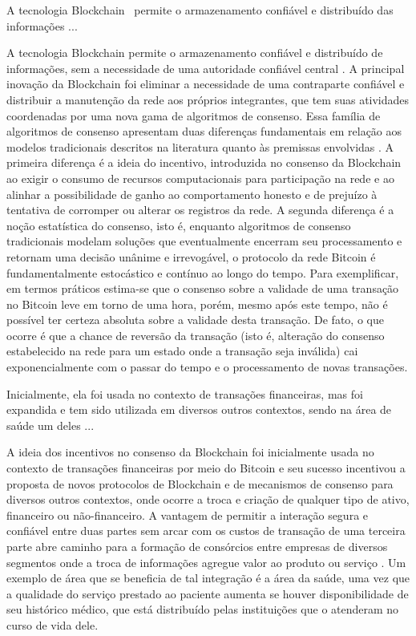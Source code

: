 \documentclass[a4paper,11pt]{article}
\begin{document}
{\color{blue} A tecnologia Blockchain~\cite{nakamoto2008bitcoin} permite o armazenamento confiável e distribuído das informações ...}

A tecnologia Blockchain permite o armazenamento confiável e distribuído de informações, sem a necessidade de uma autoridade confiável central \cite{Swan2015}.
A principal inovação da Blockchain foi eliminar a necessidade de uma contraparte confiável e distribuir a manutenção da rede aos próprios integrantes, que tem suas atividades coordenadas por uma nova gama de algoritmos de consenso.
Essa família de algoritmos de consenso apresentam duas diferenças fundamentais em relação aos modelos tradicionais descritos na literatura quanto às premissas envolvidas \cite{Narayanan2016a}.
A primeira diferença é a ideia do incentivo, introduzida no consenso da Blockchain ao exigir o consumo de recursos computacionais para participação na rede e ao alinhar a possibilidade de ganho ao comportamento honesto e de prejuízo à tentativa de corromper ou alterar os registros da rede.
A segunda diferença é a noção estatística do consenso, isto é, enquanto algoritmos de consenso tradicionais modelam soluções que eventualmente encerram seu processamento e retornam uma decisão unânime e irrevogável, o protocolo da rede Bitcoin é fundamentalmente estocástico e contínuo ao longo do tempo.
Para exemplificar, em termos práticos estima-se que o consenso sobre a validade de uma transação no Bitcoin leve em torno de uma hora, porém, mesmo após este tempo, não é possível ter certeza absoluta sobre a validade desta transação.
De fato, o que ocorre é que a chance de reversão da transação (isto é, alteração do consenso estabelecido na rede para um estado onde a transação seja inválida) cai exponencialmente com o passar do tempo e o processamento de novas transações.

{\color{blue} Inicialmente, ela foi usada no contexto de transações financeiras, mas foi expandida e tem sido utilizada em diversos outros contextos, sendo na área de saúde um deles ...}

A ideia dos incentivos no consenso da Blockchain foi inicialmente usada no contexto de transações financeiras por meio do Bitcoin \cite{nakamoto2008bitcoin} e seu sucesso incentivou a proposta de novos protocolos de Blockchain e de mecanismos de consenso para diversos outros contextos, onde ocorre a troca e criação de qualquer tipo de ativo, financeiro ou não-financeiro.
A vantagem de permitir a interação segura e confiável entre duas partes sem arcar com os custos de transação de uma terceira parte abre caminho para a formação de consórcios entre empresas de diversos segmentos onde a troca de informações agregue valor ao produto ou serviço \cite{Wust2017}.
Um exemplo de área que se beneficia de tal integração é a área da saúde, uma vez que a qualidade do serviço prestado ao paciente aumenta se houver disponibilidade de seu histórico médico, que está distribuído pelas instituições que o atenderam no curso de vida dele.
\end{document}
